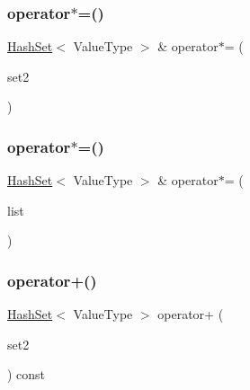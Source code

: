 \subsubsection{\texorpdfstring{operator$\ast$=()}{operator*=()}\hspace{0.1cm}{\footnotesize\ttfamily [1/2]}}
{\footnotesize\ttfamily \mbox{\hyperlink{classHashSet}{Hash\+Set}}$<$ Value\+Type $>$ \& operator$\ast$= (\begin{DoxyParamCaption}\item[{const \mbox{\hyperlink{classHashSet}{Hash\+Set}}$<$ Value\+Type $>$ \&}]{set2 }\end{DoxyParamCaption})}

\mbox{\label{classHashSet_a2a831fcda2211be2b25e2a9908465923}} 
\subsubsection{\texorpdfstring{operator$\ast$=()}{operator*=()}\hspace{0.1cm}{\footnotesize\ttfamily [2/2]}}
{\footnotesize\ttfamily \mbox{\hyperlink{classHashSet}{Hash\+Set}}$<$ Value\+Type $>$ \& operator$\ast$= (\begin{DoxyParamCaption}\item[{std\+::initializer\+\_\+list$<$ Value\+Type $>$}]{list }\end{DoxyParamCaption})}

\mbox{\label{classHashSet_a9a5483372dbdc510d27d08b82b5bc09c}} 
\subsubsection{\texorpdfstring{operator+()}{operator+()}\hspace{0.1cm}{\footnotesize\ttfamily [1/3]}}
{\footnotesize\ttfamily \mbox{\hyperlink{classHashSet}{Hash\+Set}}$<$ Value\+Type $>$ operator+ (\begin{DoxyParamCaption}\item[{const \mbox{\hyperlink{classHashSet}{Hash\+Set}}$<$ Value\+Type $>$ \&}]{set2 }\end{DoxyParamCaption}) const}

\mbox{\label{classHashSet_a4407ef198ebf93145db3ae416ef73f16}} 
